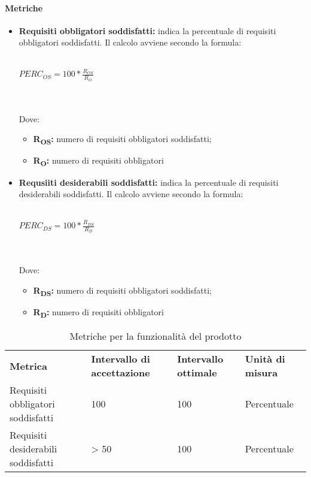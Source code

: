 \paragraph{Metriche}
\begin{itemize}
	\item \textbf{Requisiti obbligatori soddisfatti:} indica la percentuale di requisiti obbligatori soddisfatti. Il calcolo avviene secondo la formula:\\\\
	\centerline{
		\begin{math}
		PERC_{OS}=100*\frac{R_{OS}}{R_O}
		\end{math}
	}
	\\\\Dove:
	\begin{itemize}
		\item \textbf{R\textsubscript{OS}:} numero di requisiti obbligatori soddisfatti;
		\item \textbf{R\textsubscript{O}:} numero di requisiti obbligatori
	\end{itemize}
	\item \textbf{Requsiiti desiderabili soddisfatti:} indica la percentuale di requisiti desiderabili soddisfatti. Il calcolo avviene secondo la formula:\\\\
		\centerline{
		\begin{math}
		PERC_{DS}=100*\frac{R_{DS}}{R_D}
		\end{math}
	}
	\\\\Dove:
	\begin{itemize}
		\item \textbf{R\textsubscript{DS}:} numero di requisiti obbligatori soddisfatti;
		\item \textbf{R\textsubscript{D}:} numero di requisiti obbligatori
	\end{itemize}	
\end{itemize}

\renewcommand{\arraystretch}{2.2}
\begin{longtable}{|C{4.5cm}|C{2.25cm}|C{2.25cm}|C{3cm}|}
	
	\caption{Metriche per la funzionalità del prodotto}\\
	\hline
	
	\textbf{Metrica} & \textbf{Intervallo di accettazione}  & \textbf{Intervallo ottimale} & \textbf{Unità di misura}
	\tabularnewline
	\endfirsthead
	
	Requisiti obbligatori soddisfatti &  100 & 100 & Percentuale \\ 
	Requisiti desiderabili soddisfatti &  > 50 & 100 & Percentuale \\ 
\end{longtable}



